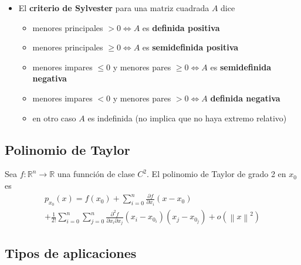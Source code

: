 \documentclass[a4paper,twocolumn]{extarticle}
\newcommand{\R}{\mathbb{R}}
\newcommand{\norma}[1]{\left\lVert#1\right\rVert}
\begin{document}
\begin{itemize}
\begin{itemize}
	\end{itemize}
	\item El \textbf{criterio de Sylvester} para una matriz cuadrada $A$ dice
	\begin{itemize}
		\item menores principales $> 0 \iff A$ es \textbf{definida positiva}
		\item menores principales $\geq 0 \iff A$ es \textbf{semidefinida positiva}
		\item menores impares $\leq 0$ y menores pares $\geq 0 \iff A$ es \textbf{semidefinida negativa}
		\item menores impares $< 0$ y menores pares $> 0 \iff A$ \textbf{definida negativa}
		\item en otro caso $A$ es indefinida (no implica que no haya extremo relativo)
	\end{itemize}
\end{itemize}

\subsection{Polinomio de Taylor}

Sea $f:\R^n \to \R$ una funnción de clase $C^2$. El polinomio de Taylor de grado 2 en $x_0$ es
\begin{multline*}
	p_{x_0}(x) = f(x_0) + \sum_{i=0}^n \frac{\partial f}{\partial x_i}(x - x_0)\\
	+ \frac{1}{2!}\sum_{i=0}^n\sum_{j=0}^n \frac{\partial^2 f}{\partial x_i\partial x_j}(x_i - x_{0_i})(x_j - x_{0_j}) + o(\norma{x}^2)
\end{multline*}

\subsection{Tipos de aplicaciones}
\end{document}
